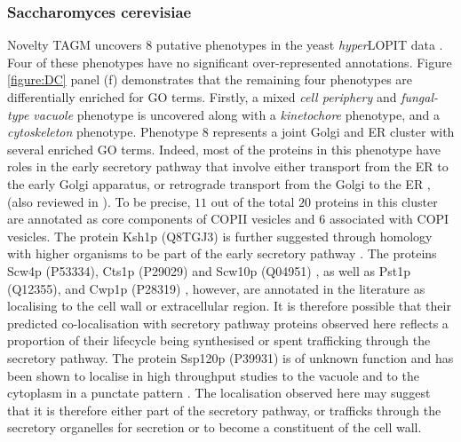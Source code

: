 \documentclass[12pt,english]{article}
\begin{document}
 \subsubsection{Saccharomyces cerevisiae}
Novelty TAGM uncovers $8$ putative phenotypes in the yeast \textit{hyper}LOPIT data \citep{Nightingale::2019}. Four of these phenotypes have no significant over-represented annotations.
Figure \ref{figure:DC} panel (f) demonstrates that the remaining four phenotypes are differentially enriched for GO terms. Firstly, a mixed \textit{cell periphery} and \textit{fungal-type vacuole} phenotype is uncovered along with a \textit{kinetochore} phenotype, and a \textit{cytoskeleton} phenotype. Phenotype $8$ represents a joint Golgi and ER cluster with several enriched GO terms.  Indeed, most of the proteins in this phenotype have roles in the early secretory pathway that involve either transport from the ER to the early Golgi apparatus, or retrograde transport from the Golgi to the ER \citep{Bue:2006,Inadome:2005, Otte:2001, Yofe:2016}, (also reviewed in \cite{Delic:2013}).
To be precise, $11$ out of the total $20$ proteins in this cluster are annotated as core components of COPII vesicles and $6$ associated with COPI vesicles. The protein Ksh1p (Q8TGJ3) is further suggested through homology with higher organisms to be part of the early secretory pathway \citep{Wendler:2010}. The proteins Scw4p (P53334), Cts1p (P29029) and Scw10p (Q04951) \citep{Cappellaro:1998}, as well as Pst1p (Q12355)\citep{Pardo:2004}, and Cwp1p (P28319) \citep{Yin:2005}, however, are annotated in the literature as localising to the cell wall or extracellular region. It is therefore possible that their predicted co-localisation with secretory pathway proteins observed here reflects a proportion of their lifecycle being synthesised or spent trafficking through the secretory pathway. The protein Ssp120p (P39931) is of unknown function and has been shown to localise in high throughput studies to the vacuole \citep{Yofe:2016} and to the cytoplasm in a punctate pattern \citep{Huh:2003}. The localisation observed here may suggest that it is therefore either part of the secretory pathway, or trafficks through the secretory organelles for secretion or to become a constituent of the cell wall. 
\end{document}
